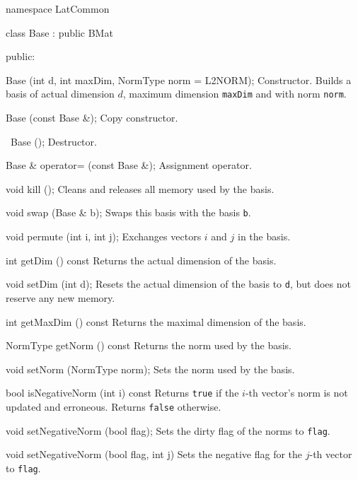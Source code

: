 namespace LatCommon {
 
class Base : public BMat {
public:

   Base (int d, int maxDim, NormType norm = L2NORM);
\endcode
\tabb
Constructor. Builds a basis of actual dimension $d$, maximum dimension
 \texttt{maxDim} and with norm \texttt{norm}.
\endtabb
\code

   Base (const Base &);
\endcode
\tabb
Copy constructor.
\endtabb
\code

   ~Base ();
\endcode
\tabb
Destructor.
\endtabb
\code

   Base & operator= (const Base &);
\endcode
\tabb
Assignment operator.
\endtabb
\code
   
   void kill ();
\endcode
\tabb
Cleans and releases all memory used by the basis.
\endtabb
\code

   void swap (Base & b);
\endcode
\tabb
Swaps this basis with the basis \texttt{b}.
\endtabb
\code

   void permute (int i, int j);
\endcode
\tabb
Exchanges vectors $i$ and $j$ in the basis.
\endtabb
\code

   int getDim () const  \endhide
\endcode
\tabb
Returns the actual dimension of the basis.
\endtabb
\code
   
   void setDim (int d);
\endcode
\tabb
Resets the actual dimension of the basis to \texttt{d}, but does 
not reserve any new memory.
\endtabb
\code

   int getMaxDim () const  \endhide
\endcode
\tabb
Returns the maximal dimension of the basis.
\endtabb
\code

   NormType getNorm () const  \endhide
\endcode
\tabb
Returns the norm used by the basis.
\endtabb
\code

   void setNorm (NormType norm);
\endcode
\tabb
Sets the norm used by the basis.
\endtabb
\code

   bool isNegativeNorm (int i) const  \endhide
\endcode
\tabb
Returns \texttt{true} if the $i$-th vector's norm is not updated and
 erroneous. Returns \texttt{false} otherwise.
\endtabb
\code

   void setNegativeNorm (bool flag);
\endcode
\tabb
Sets the dirty flag of the norms to \texttt{flag}.
\endtabb
\code

   void setNegativeNorm (bool flag, int j) \endhide
\endcode
\tabb
Sets the negative flag for the $j$-th vector to \texttt{flag}.
\endtabb
\code

}}

